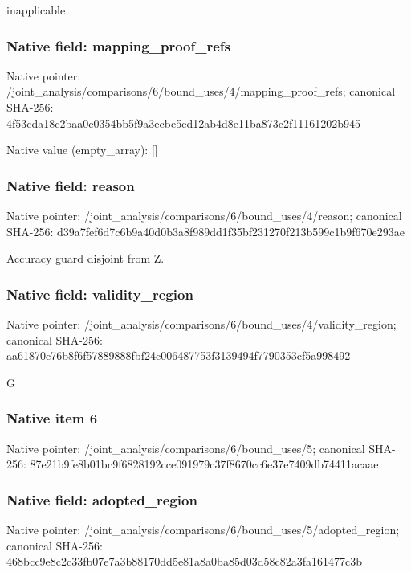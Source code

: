 \documentclass[10pt,a4paper]{article}
\begin{document}
\begingroup\raggedright\sloppy inapplicable\par\endgroup

\subsubsection{Native field: mapping\_\allowbreak{}proof\_\allowbreak{}refs}
Native pointer: /joint\_\allowbreak{}analysis/comparisons/6/bound\_\allowbreak{}uses/4/mapping\_\allowbreak{}proof\_\allowbreak{}refs; canonical SHA-256: 4f53cda18c2baa0c0354bb5f9a3ecbe5ed12ab4d8e11ba873c2f11161202b945

Native value (empty\_\allowbreak{}array): []

\subsubsection{Native field: reason}
Native pointer: /joint\_\allowbreak{}analysis/comparisons/6/bound\_\allowbreak{}uses/4/reason; canonical SHA-256: d39a7fef6d7c6b9a40d0b3a8f989dd1f35bf231270f213b599c1b9f670e293ae

\begingroup\raggedright\sloppy Accuracy guard disjoint from Z.\par\endgroup

\subsubsection{Native field: validity\_\allowbreak{}region}
Native pointer: /joint\_\allowbreak{}analysis/comparisons/6/bound\_\allowbreak{}uses/4/validity\_\allowbreak{}region; canonical SHA-256: aa61870c76b8f6f57889888fbf24c006487753f3139494f7790353cf5a998492

\begingroup\raggedright\sloppy G\par\endgroup

\subsubsection{Native item 6}
Native pointer: /joint\_\allowbreak{}analysis/comparisons/6/bound\_\allowbreak{}uses/5; canonical SHA-256: 87e21b9fe8b01bc9f6828192cce091979c37f8670cc6e37e7409db74411acaae

\subsubsection{Native field: adopted\_\allowbreak{}region}
Native pointer: /joint\_\allowbreak{}analysis/comparisons/6/bound\_\allowbreak{}uses/5/adopted\_\allowbreak{}region; canonical SHA-256: 468bcc9e8c2c33fb07e7a3b88170dd5e81a8a0ba85d03d58c82a3fa161477c3b
\end{document}
